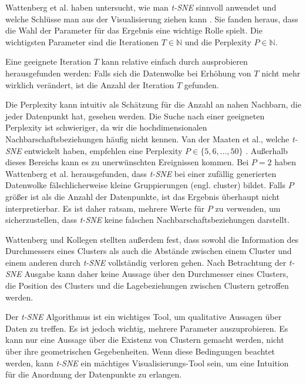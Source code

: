 \documentclass[12pt,letterpaper,ngerman]{article}
\begin{document}
Wattenberg et al. haben untersucht, wie man  \textit{t-SNE} sinnvoll
anwendet und welche Schlüsse man aus der Visualisierung 
ziehen kann \cite{wattenberg2016how}. 
Sie fanden heraus, dass die Wahl der Parameter 
für das Ergebnis eine wichtige Rolle spielt. Die wichtigsten 
Parameter sind die Iterationen $T\in \mathbb{N}$ und die Perplexity 
$P \in \mathbb{N}$. 

Eine geeignete Iteration $T$ kann relative einfach durch ausprobieren 
herausgefunden werden: Falls sich die Datenwolke bei Erhöhung
von $T$ nicht mehr wirklich verändert, ist die Anzahl der Iteration
$T$ gefunden. 
\pagebreak

Die Perplexity kann intuitiv als Schätzung für die Anzahl an nahen 
Nachbarn, die jeder Datenpunkt hat, gesehen werden.
Die Suche nach einer geeigneten Perplexity ist schwieriger, 
da wir die hochdimensionalen Nachbarschaftsbeziehungen häufig 
nicht kennen. Van der Maaten et al., welche  \textit{t-SNE} entwickelt haben,
empfehlen eine Perplexity $P \in \{5,6, \dots, 50\}$ 
\cite{JMLR:v9:vandermaaten08a}.
Außerhalb dieses Bereichs kann es zu unerwünschten Ereignissen 
kommen. Bei $P=2$ haben Wattenberg et al. herausgefunden, 
dass  \textit{t-SNE} bei einer zufällig generierten Datenwolke 
fälschlicherweise kleine Gruppierungen (engl. cluster) bildet. 
Falls $P$ größer ist als die Anzahl der Datenpunkte, ist das
Ergebnis überhaupt nicht interpretierbar. Es ist daher ratsam,
mehrere Werte für $P$ zu verwenden, um sicherzustellen, 
dass  \textit{t-SNE} keine falschen Nachbarschaftsbeziehungen darstellt.

Wattenberg und Kollegen stellten außerdem fest, dass sowohl die 
Information des Durchmessers eines Clusters als auch die Abstände 
zwischen einem Cluster und einem anderen durch  \textit{t-SNE} vollständig 
verloren gehen. Nach Betrachtung der  \textit{t-SNE} Ausgabe kann daher 
keine Aussage über den Durchmesser eines Clusters, die Position 
des Clusters und die Lagebeziehungen zwischen Clustern getroffen 
werden. 

Der  \textit{t-SNE} Algorithmus ist ein wichtiges Tool, um qualitative 
Aussagen über Daten zu treffen. Es ist jedoch wichtig, mehrere 
Parameter auszuprobieren. Es kann nur eine Aussage über die 
Existenz von Clustern gemacht werden, nicht über ihre geometrischen 
Gegebenheiten. Wenn diese Bedingungen beachtet werden, kann  \textit{t-SNE}
ein mächtiges Visualisierungs-Tool sein, um eine Intuition für die
Anordnung der Datenpunkte zu erlangen.

\end{document}
